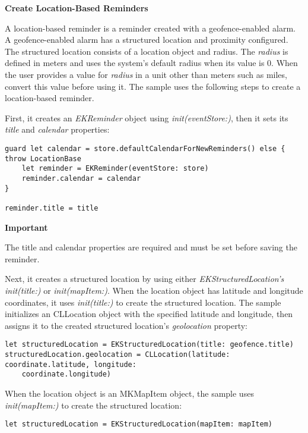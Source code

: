 \documentclass{article}
\begin{document}
\textbf{Create Location-Based Reminders}

A location-based reminder is a reminder created with a geofence-enabled alarm. A geofence-enabled alarm has a structured location and proximity configured. The structured location consists of a location object and radius. The \textit{radius} is defined in meters and uses the system's default radius when its value is 0. When the user provides a value for \textit{radius} in a unit other than meters such as miles, convert this value before using it. The sample uses the following steps to create a location-based reminder.

First, it creates an \textit{EKReminder} object using \textit{init(eventStore:)}, then it sets its \textit{title} and \textit{calendar} properties:

\begin{verbatim}
guard let calendar = store.defaultCalendarForNewReminders() else { throw LocationBase
    let reminder = EKReminder(eventStore: store)
    reminder.calendar = calendar
}

reminder.title = title
\end{verbatim}

\textbf{Important}

The title and calendar properties are required and must be set before saving the reminder.

Next, it creates a structured location by using either \textit{EKStructuredLocation's init(title:)} or \textit{init(mapItem:)}. When the location object has latitude and longitude coordinates, it uses \textit{init(title:)} to create the structured location. The sample initializes an CLLocation object with the specified latitude and longitude, then assigns it to the created structured location's \textit{geolocation} property:

\begin{verbatim}
let structuredLocation = EKStructuredLocation(title: geofence.title)
structuredLocation.geolocation = CLLocation(latitude: coordinate.latitude, longitude: 
    coordinate.longitude)
\end{verbatim}

When the location object is an MKMapItem object, the sample uses \textit{init(mapItem:)} to create the structured location:

\begin{verbatim}
let structuredLocation = EKStructuredLocation(mapItem: mapItem)
\end{verbatim}
\end{document}
